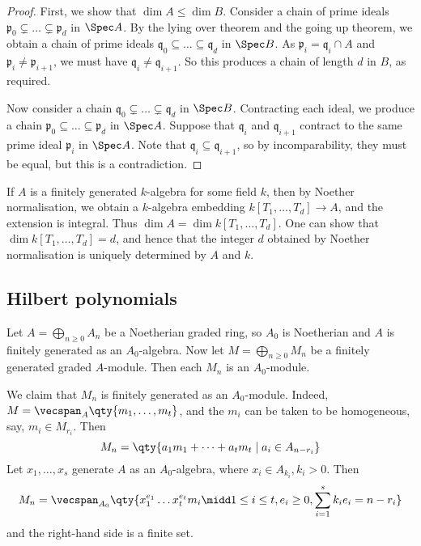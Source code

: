 \begin{proof}
    First, we show that \( \dim A \leq \dim B \).
    Consider a chain of prime ideals \( \mathfrak p_0 \subsetneq \dots \subsetneq \mathfrak p_d \) in \( \Spec A \).
    By the lying over theorem and the going up theorem, we obtain a chain of prime ideals \( \mathfrak q_0 \subseteq \dots \subseteq \mathfrak q_d \) in \( \Spec B \).
    As \( \mathfrak p_i = \mathfrak q_i \cap A \) and \( \mathfrak p_i \neq \mathfrak p_{i+1} \), we must have \( \mathfrak q_i \neq \mathfrak q_{i+1} \).
    So this produces a chain of length \( d \) in \( B \), as required.

    Now consider a chain \( \mathfrak q_0 \subsetneq \dots \subsetneq \mathfrak q_d \) in \( \Spec B \).
    Contracting each ideal, we produce a chain \( \mathfrak p_0 \subseteq \dots \subseteq \mathfrak p_d \) in \( \Spec A \).
    Suppose that \( \mathfrak q_i \) and \( \mathfrak q_{i+1} \) contract to the same prime ideal \( \mathfrak p_i \) in \( \Spec A \).
    Note that \( \mathfrak q_i \subseteq \mathfrak q_{i+1} \), so by incomparability, they must be equal, but this is a contradiction.
\end{proof}
\begin{remark}
    If \( A \) is a finitely generated \( k \)-algebra for some field \( k \), then by Noether normalisation, we obtain a \( k \)-algebra embedding \( k[T_1, \dots, T_d] \to A \), and the extension is integral.
    Thus \( \dim A = \dim k[T_1, \dots, T_d] \).
    One can show that \( \dim k[T_1, \dots, T_d] = d \), and hence that the integer \( d \) obtained by Noether normalisation is uniquely determined by \( A \) and \( k \).
\end{remark}

\subsection{Hilbert polynomials}
Let \( A = \bigoplus_{n \geq 0} A_n \) be a Noetherian graded ring, so \( A_0 \) is Noetherian and \( A \) is finitely generated as an \( A_0 \)-algebra.
Now let \( M = \bigoplus_{n \geq 0} M_n \) be a finitely generated graded \( A \)-module.
Then each \( M_n \) is an \( A_0 \)-module.

We claim that \( M_n \) is finitely generated as an \( A_0 \)-module.
Indeed, \( M = \vecspan_A\qty{m_1, \dots, m_t} \), and the \( m_i \) can be taken to be homogeneous, say, \( m_i \in M_{r_i} \).
Then
\[ M_n = \qty{a_1 m_1 + \dots + a_t m_t \mid a_i \in A_{n-r_i}} \]
Let \( x_1, \dots, x_s \) generate \( A \) as an \( A_0 \)-algebra, where \( x_i \in A_{k_i}, k_i > 0 \).
Then
\[ M_n = \vecspan_{A_0}\qty{x_1^{e_1} \dots x_t^{e_t} m_i \midd 1 \leq i \leq t, e_i \geq 0, \sum_{i=1}^s k_i e_i = n - r_i} \]
and the right-hand side is a finite set.

